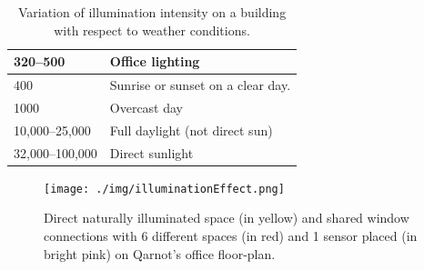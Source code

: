 \begin{center}
\begin{table}[]
\begin{tabular}{ll}
\multicolumn{1}{|l|}{320–500}                  & \multicolumn{1}{l|}{Office lighting }         \\ \hline
\multicolumn{1}{|l|}{400}                      & \multicolumn{1}{l|}{Sunrise or sunset on a clear day.}                      \\ \hline
\multicolumn{1}{|l|}{1000}                     & \multicolumn{1}{l|}{Overcast day }        \\ \hline
\multicolumn{1}{|l|}{10,000–25,000}            & \multicolumn{1}{l|}{Full daylight (not direct sun) }                  \\ \hline
32,000–100,000                                 & Direct sunlight                                                             \\ \hline
\end{tabular}
\caption{Variation of illumination intensity on a building with respect to weather conditions. }
\label{table:luxVariation}
\end{table}
\end{center}

\begin{figure}
\centering
  \texttt{[image: ./img/illuminationEffect.png]}
  \caption{ Direct naturally illuminated space (in yellow) and shared window connections with 6 different spaces (in red) and 1 sensor placed (in bright pink) on Qarnot's office floor-plan. }
  \label{fig:illuminationEffect}
\end{figure}

